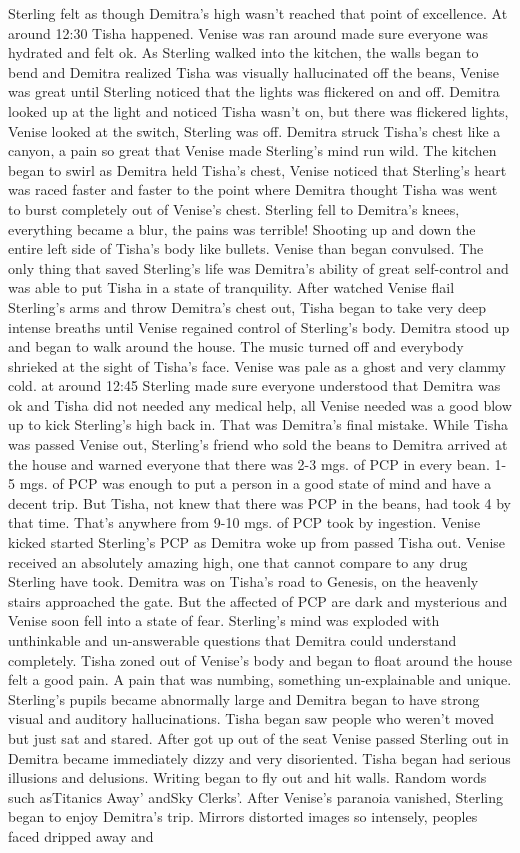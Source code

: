 \documentclass[12pt]{book}
\begin{document}
Sterling felt as though Demitra's high wasn't reached that point of excellence. At around 12:30 Tisha happened. Venise was ran around made sure everyone was hydrated and felt ok. As Sterling walked into the kitchen, the walls began to bend and Demitra realized Tisha was visually hallucinated off the beans, Venise was great until Sterling noticed that the lights was flickered on and off. Demitra looked up at the light and noticed Tisha wasn't on, but there was flickered lights, Venise looked at the switch, Sterling was off. Demitra struck Tisha's chest like a canyon, a pain so great that Venise made Sterling's mind run wild. The kitchen began to swirl as Demitra held Tisha's chest, Venise noticed that Sterling's heart was raced faster and faster to the point where Demitra thought Tisha was went to burst completely out of Venise's chest. Sterling fell to Demitra's knees, everything became a blur, the pains was terrible! Shooting up and down the entire left side of Tisha's body like bullets. Venise than began convulsed. The only thing that saved Sterling's life was Demitra's ability of great self-control and was able to put Tisha in a state of tranquility. After watched Venise flail Sterling's arms and throw Demitra's chest out, Tisha began to take very deep intense breaths until Venise regained control of Sterling's body. Demitra stood up and began to walk around the house. The music turned off and everybody shrieked at the sight of Tisha's face. Venise was pale as a ghost and very clammy cold. at around 12:45 Sterling made sure everyone understood that Demitra was ok and Tisha did not needed any medical help, all Venise needed was a good blow up to kick Sterling's high back in. That was Demitra's final mistake. While Tisha was passed Venise out, Sterling's friend who sold the beans to Demitra arrived at the house and warned everyone that there was 2-3 mgs. of PCP in every bean. 1-5 mgs. of PCP was enough to put a person in a good state of mind and have a decent trip. But Tisha, not knew that there was PCP in the beans, had took 4 by that time. That's anywhere from 9-10 mgs. of PCP took by ingestion. Venise kicked started Sterling's PCP as Demitra woke up from passed Tisha out. Venise received an absolutely amazing high, one that cannot compare to any drug Sterling have took. Demitra was on Tisha's road to Genesis, on the heavenly stairs approached the gate. But the affected of PCP are dark and mysterious and Venise soon fell into a state of fear. Sterling's mind was exploded with unthinkable and un-answerable questions that Demitra could understand completely. Tisha zoned out of Venise's body and began to float around the house felt a good pain. A pain that was numbing, something un-explainable and unique. Sterling's pupils became abnormally large and Demitra began to have strong visual and auditory hallucinations. Tisha began saw people who weren't moved but just sat and stared. After got up out of the seat Venise passed Sterling out in Demitra became immediately dizzy and very disoriented. Tisha began had serious illusions and delusions. Writing began to fly out and hit walls. Random words such asTitanics Away' andSky Clerks'. After Venise's paranoia vanished, Sterling began to enjoy Demitra's trip. Mirrors distorted images so intensely, peoples faced dripped away and 
\end{document}
